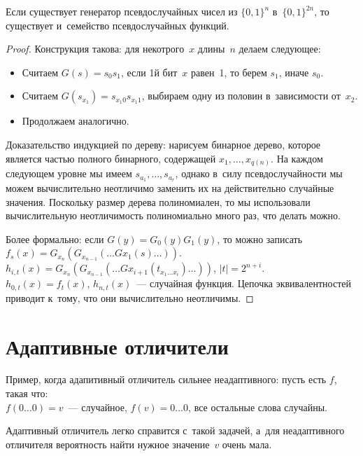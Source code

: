 \documentclass{article}
\begin{document}
\begin{theorem}
	Если существует генератор псевдослучайных чисел из $\{0, 1\}^n$ в~$\{0,
	1\}^{2n}$, то существует и~семейство псевдослучайных функций.
\end{theorem}
\begin{proof}
	Конструкция такова: для некотрого~$x$ длины~$n$ делаем следующее:
	\begin{itemize}
		\item Считаем $G(s) = s_0 s_1$, если 1й бит~$x$ равен~1, то берем $s_1$,
			иначе $s_0$.
		\item Считаем $G(s_{x_1}) = s_{x_1 0}s_{x_1 1}$, выбираем одну из половин
			в~зависимости от~$x_2$.
		\item Продолжаем аналогично.
	\end{itemize}

	Доказательство индукцией по дереву: нарисуем бинарное дерево, которое является
	частью полного бинарного, содержащей $x_1, \ldots, x_{q(n)}$. На каждом
	следующем уровне мы имеем $s_{a_1}, \ldots, s_{a_r}$, однако в~силу
	псевдослучайности мы можем вычислительно неотличимо заменить их на
	действительно случайные значения. Поскольку размер дерева полиномиален, то мы
	использовали вычислительную неотличимость полиномиально много раз, что делать
	можно.

	Более формально: если $G(y) = G_0(y)G_1(y)$, то можно записать $f_s(x) =
	G_{x_n}(G_{x_{n-1}}(\ldots G{x_1}(s)\ldots))$.\\
	$h_{i,t}(x)=G_{x_n}(G_{x_{n-1}}(\ldots G{x_{i+1}}(t_{x_1\ldots x_i})\ldots))$,
	$|t|=2^{n+i}$.\\
	$h_{0,t}(x) = f_t(x)$, $h_{n,t}(x)$~--- случайная функция.
	Цепочка эквивалентностей приводит к~тому, что они вычислительно неотличимы.
\end{proof}

\section{Адаптивные отличители}

\begin{example}
	Пример, когда адапитивный отличитель сильнее неадаптивного: пусть есть $f$,
	такая что:\\
	$f(0 \ldots 0) = v$~--- случайное, $f(v) = 0 \ldots 0$, все остальные слова
	случайны.

	Адаптивный отличитель легко справится с~такой задачей, а~для неадаптивного
	отличителя вероятность найти нужное значение~$v$ очень мала.
\end{example}
\end{document}
